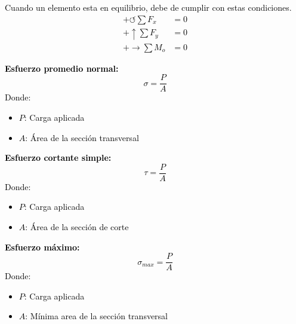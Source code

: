 \documentclass[letterpaper,12pt]{extarticle}
\newcommand{\mybox}[2]
{
    \begin{tcolorbox}[colback=color!5!white,colframe=color!75!black,boxsep=1pt,arc=0pt,outer arc=0pt,title={\textcolor{white}{#1}}]
        \textcolor{black}{#2}
    \end{tcolorbox}
}
\begin{document}
    \fontsize{10pt}{11pt}\selectfont

    \begin{multicols}{2}

    \mybox{Condiciones de equilibrio}
    {
        Cuando un elemento esta en equilibrio, debe de cumplir con estas condiciones.
        \begin{subequations}
            \begin{align}
                +\circlearrowleft \sum F_x &= 0 \\
                +\uparrow \sum F_y &= 0 \\
                +\rightarrow \sum M_o &= 0
            \end{align}
        \end{subequations}
    }

    \mybox{Analisis de esfuerzos}
    {
        \textbf{Esfuerzo promedio normal:}
        \begin{equation}
            \sigma = \frac{P}{A}
        \end{equation}
        Donde: \space
        \begin{itemize}
            \item \( P \): Carga aplicada
            \item \( A \): Área de la sección transversal
        \end{itemize}
        \vspace{5mm}
        \textbf{Esfuerzo cortante simple:}
        \begin{equation}
            \tau = \frac{P}{A}
        \end{equation}
        Donde: \space
        \begin{itemize}
            \item \( P \): Carga aplicada
            \item \( A \): Área de la sección de corte
        \end{itemize}
        \vspace{5mm}
        \textbf{Esfuerzo máximo:}
        \begin{equation}
            \sigma_{max} = \frac{P}{A}
        \end{equation}
        Donde: \space
        \begin{itemize}
            \item \( P \): Carga aplicada
            \item \( A \): Mínima area de la sección transversal
        \end{itemize}
    }

    \end{multicols}
\end{document}
